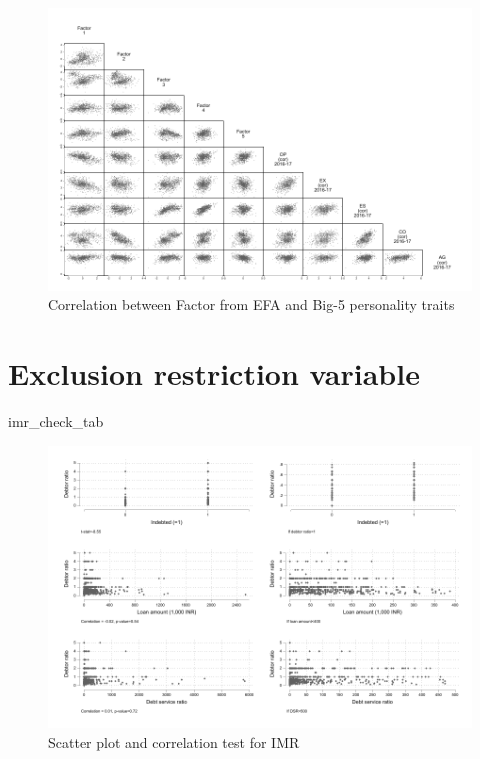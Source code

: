 \documentclass[a4paper, 11pt, onecolumn]{article}
\begin{document}
\begin{figure}[!htb]
\raggedright
\includegraphics[scale=0.85]{INPUT/matrix_b5_efa}
\caption{Correlation between Factor from EFA and Big-5 personality traits}
\label{fig:descXY}
\end{figure}




\clearpage
\newpage
\section{Exclusion restriction variable}
\label{app:imr}


{imr_check_tab}

\begin{figure}[!htb]
\raggedright
\includegraphics[scale=0.85]{INPUT/imr_check}
\caption{Scatter plot and correlation test for IMR}
\label{fig:imrcheck}
\end{figure}
\end{document}
